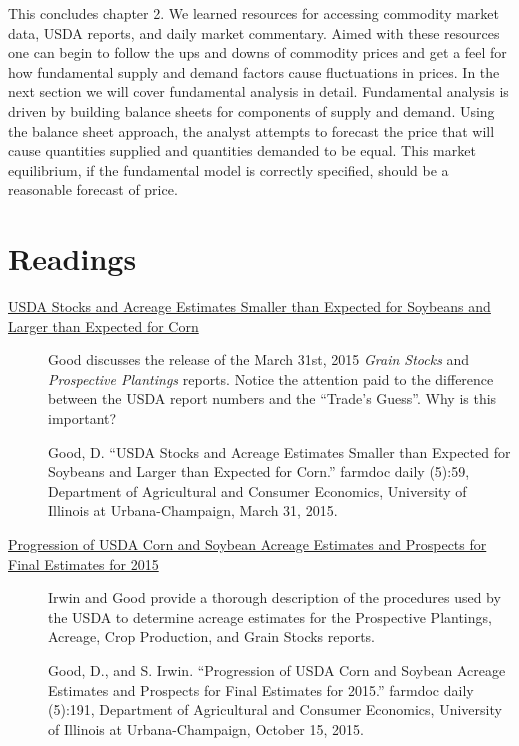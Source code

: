 \documentclass[]{book}
\theoremstyle{definition}
\theoremstyle{definition}
\theoremstyle{remark}
\begin{document}
This concludes chapter 2. We learned resources for accessing commodity
market data, USDA reports, and daily market commentary. Aimed with these
resources one can begin to follow the ups and downs of commodity prices
and get a feel for how fundamental supply and demand factors cause
fluctuations in prices. In the next section we will cover fundamental
analysis in detail. Fundamental analysis is driven by building balance
sheets for components of supply and demand. Using the balance sheet
approach, the analyst attempts to forecast the price that will cause
quantities supplied and quantities demanded to be equal. This market
equilibrium, if the fundamental model is correctly specified, should be
a reasonable forecast of price.

\section{Readings}\label{readings-1}

\begin{description}
\item[\href{http://farmdocdaily.illinois.edu/2015/03/usda-stocks-and-acreage-estimates-for-soybeans-and-corn.html}{USDA
Stocks and Acreage Estimates Smaller than Expected for Soybeans and
Larger than Expected for Corn}]
Good discusses the release of the March 31st, 2015 \emph{Grain Stocks}
and \emph{Prospective Plantings} reports. Notice the attention paid to
the difference between the USDA report numbers and the ``Trade's
Guess''. Why is this important?

Good, D. ``USDA Stocks and Acreage Estimates Smaller than Expected for
Soybeans and Larger than Expected for Corn.'' farmdoc daily (5):59,
Department of Agricultural and Consumer Economics, University of
Illinois at Urbana-Champaign, March 31, 2015.
\item[\href{http://farmdocdaily.illinois.edu/2015/10/progression-usda-corn-and-soybean-acreage-estimates.html}{Progression
of USDA Corn and Soybean Acreage Estimates and Prospects for Final
Estimates for 2015}]
Irwin and Good provide a thorough description of the procedures used by
the USDA to determine acreage estimates for the Prospective Plantings,
Acreage, Crop Production, and Grain Stocks reports.

Good, D., and S. Irwin. ``Progression of USDA Corn and Soybean Acreage
Estimates and Prospects for Final Estimates for 2015.'' farmdoc daily
(5):191, Department of Agricultural and Consumer Economics, University
of Illinois at Urbana-Champaign, October 15, 2015.
\end{description}
\end{document}
